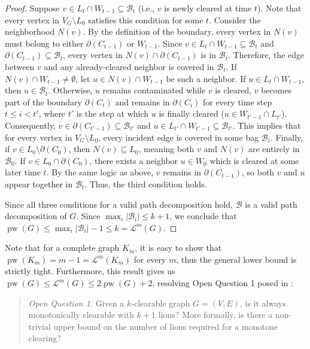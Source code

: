 \documentclass[a4paper,UKenglish,cleveref, autoref, thm-restate]{lipics-v2021}
\begin{document}
\begin{proof}
 Suppose $v \in L_t \cap W_{t-1} \subseteq \mathcal{B}_t$ (i.e., $v$ is newly cleared at time $t$). Note that every vertex in $V_G \setminus L_0$ satisfies this condition for some $t$.
Consider the neighborhood $N(v)$. By the definition of the boundary, every vertex in $N(v)$ must belong to either $\partial(C_{t-1})$ or $W_{t-1}$.
Since $v \in L_t \cap W_{t-1} \subseteq \mathcal{B}_t$ and $\partial(C_{t-1}) \subseteq \mathcal{B}_t$, every vertex in $N(v) \cap \partial(C_{t-1})$ is in $\mathcal{B}_t$. Therefore, the edge between $v$ and any already-cleared neighbor is covered in $\mathcal{B}_t$.
If $N(v) \cap W_{t-1} \neq \emptyset$, let $u \in N(v)\cap W_{t-1}$ be such a neighbor. If $u\in L_t\cap W_{t-1}$, then $u\in \mathcal{B}_t$. Otherwise, $u$ remains contaminated while $v$ is cleared, $v$ becomes part of the boundary $\partial(C_t)$ and remains in $\partial(C_i)$ for every time step $t \leq i < t'$, where $t'$ is the step at which $u$ is finally cleared ($u \in W_{t'-1} \cap L_{t'}$). Consequently, $v \in \partial(C_{t'-1}) \subseteq \mathcal{B}_{t'}$ and $u \in L_{t'} \cap W_{t'-1} \subseteq \mathcal{B}_{t'}$. This implies that for every vertex in $V_G \setminus L_0$, every incident edge is covered in some bag $\mathcal{B}_i$.
Finally, if $v \in L_0 \setminus \partial(C_0)$, then $N(v) \subseteq L_0$, meaning both $v$ and $N(v)$ are entirely in $\mathcal{B}_0$. If $v \in L_0 \cap \partial(C_0)$, there exists a neighbor $u \in W_0$ which is cleared at some later time $t$. By the same logic as above, $v$ remains in $\partial(C_{t-1})$, so both $v$ and $u$ appear together in $\mathcal{B}_t$. Thus, the third condition holds.

Since all three conditions for a valid path decomposition hold, $\mathcal{B}$ is a valid path decomposition of $G$. Since $\max_i |\mathcal{B}_i| \leq k+1$, we conclude that $\operatorname{pw}(G) \leq \max_i |\mathcal{B}_i| - 1 \leq k = \mathcal{L}^m(G)$.
\end{proof}

Note that for a complete graph $K_m$, it is easy to show that $\operatorname{pw}(K_m)=m-1=\mathcal{L}^m(K_m)$ for every $m$, thus the general lower bound is strictly tight. Furthermore, this result gives us $\operatorname{pw}(G) \leq \mathcal{L}^m(G) \leq 2\operatorname{pw}(G)+2$, resolving Open Question 1 posed in \cite{Bertschinger23}:

\begin{quote}
\emph{Open Question 1.}\cite{Bertschinger23} Given a $k$-clearable graph $G = (V, E)$, is it always monotonically clearable with $k + 1$ lions? More formally, is there a non-trivial upper bound on the number of lions required for a monotone clearing?
\end{quote}
\end{document}

